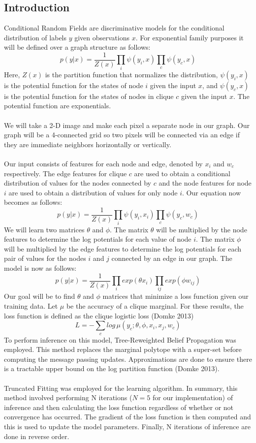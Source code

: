 \subsection{Introduction}

Conditional Random Fields are discriminative models for the conditional distribution of labels $y$ given observations $x$. For exponential family purposes it will be defined over a graph structure as follows:
\[
p(y|x) = \frac{1}{Z(x)} \prod_i{\psi(y_i,x)} \prod_{c}{\psi(y_c,x)}
\]
Here, $Z(x)$ is the partition function that normalizes the distribution, $\psi(y_i,x)$ is the potential function for the states of node $i$ given the input $x$, and $\psi(y_c,x)$ is the potential function for the states of nodes in clique $c$ given the input $x$. The potential function are exponentials.\\
\\
We will take a 2-D image and make each pixel a separate node in our graph. Our graph will be a 4-connected grid so two pixels will be connected via an edge if they are immediate neighbors horizontally or vertically. \\
\\
Our input consists of features for each node and edge, denoted by $x_i$ and $w_c$ respectively. The edge features for clique $c$ are used to obtain a conditional distribution of values for the nodes connected by $c$ and the node features for node $i$ are used to obtain a distribution of values for only node $i$. Our equation now becomes as follows:
\[
p(y|x) = \frac{1}{Z(x)} \prod_i{\psi(y_i,x_i)} \prod_{c}{\psi(y_c,w_c)}
\]
We will learn two matrices $\theta$ and $\phi$. The matrix $\theta$ will be multiplied by the node features to determine the log potentials for each value of node $i$. The matrix $\phi$ will be multiplied by the edge features to determine the log potentials for each pair of values for the nodes $i$ and $j$ connected by an edge in our graph. The model is now as follows:
\[
p(y|x) = \frac{1}{Z(x)} \prod_i{exp(\theta x_i)} \prod_{ij}{exp(\phi w_{ij})}
\]
Our goal will be to find $\theta$ and $\phi$ matrices that minimize a loss function given our training data. Let $\mu$ be the accuracy of a clique marginal. For these results, the loss function is defined as the clique logistic loss (Domke 2013)
\[
L = - \sum_c {log \, \mu(y_c; \theta, \phi, x_i, x_j, w_c)}
\]
To perform inference on this model, Tree-Reweighted Belief Propagation was employed. This method replaces the marginal polytope with a super-set before computing the message passing updates. Approximations are done to ensure there is a tractable upper bound on the log partition function (Domke 2013). \\
\\
Truncated Fitting was employed for the learning algorithm. In summary, this method involved performing N iterations ($N=5$ for our implementation) of inference and then calculating the loss function regardless of whether or not convergence has occurred. The gradient of the loss function is then computed and this is used to update the model parameters. Finally, N iterations of inference are done in reverse order. 

